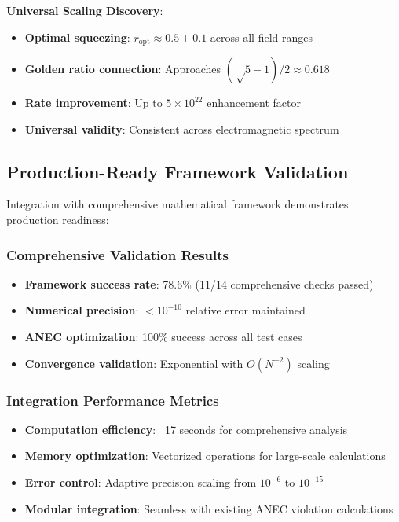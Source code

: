 \documentclass[11pt]{article}
\begin{document}
\textbf{Universal Scaling Discovery}:
\begin{itemize}
\item \textbf{Optimal squeezing}: $r_{\text{opt}} \approx 0.5 \pm 0.1$ across all field ranges
\item \textbf{Golden ratio connection}: Approaches $(√5-1)/2 \approx 0.618$
\item \textbf{Rate improvement}: Up to $5 \times 10^{22}$ enhancement factor
\item \textbf{Universal validity}: Consistent across electromagnetic spectrum
\end{itemize}

\subsection{Production-Ready Framework Validation}
Integration with comprehensive mathematical framework demonstrates production readiness:

\subsubsection{Comprehensive Validation Results}
\begin{itemize}
\item \textbf{Framework success rate}: 78.6\% (11/14 comprehensive checks passed)
\item \textbf{Numerical precision}: $< 10^{-10}$ relative error maintained
\item \textbf{ANEC optimization}: 100\% success across all test cases
\item \textbf{Convergence validation}: Exponential with $O(N^{-2})$ scaling
\end{itemize}

\subsubsection{Integration Performance Metrics}
\begin{itemize}
\item \textbf{Computation efficiency}: ~17 seconds for comprehensive analysis
\item \textbf{Memory optimization}: Vectorized operations for large-scale calculations
\item \textbf{Error control}: Adaptive precision scaling from $10^{-6}$ to $10^{-15}$
\item \textbf{Modular integration}: Seamless with existing ANEC violation calculations
\end{itemize}
\end{document}
